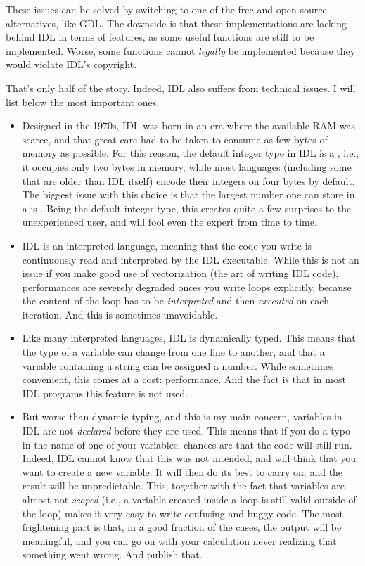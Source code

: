 \documentclass[12pt]{report}
\begin{document}
These issues can be solved by switching to one of the free and open-source alternatives, like GDL. The downside is that these implementations are lacking behind IDL in terms of features, as some useful functions are still to be implemented. Worse, some functions cannot \emph{legally} be implemented because they would violate IDL's copyright.

That's only half of the story. Indeed, IDL also suffers from technical issues. I will list below the most important ones.
\begin{itemize}
\item Designed in the 1970s, IDL was born in an era where the available RAM was scarce, and that great care had to be taken to consume as few bytes of memory as possible. For this reason, the default integer type in IDL is a , i.e., it occupies only two bytes in memory, while most languages (including some that are older than IDL itself) encode their integers on four bytes by default. The biggest issue with this choice is that the largest number one can store in a  is . Being the default integer type, this creates quite a few surprises to the unexperienced user, and will fool even the expert from time to time.
\item IDL is an interpreted language, meaning that the code you write is continuously read and interpreted by the IDL executable. While this is not an issue if you make good use of vectorization (the art of writing IDL code), performances are severely degraded onces you write loops explicitly, because the content of the loop has to be \emph{interpreted} and then \emph{executed} on each iteration. And this is sometimes unavoidable.
\item Like many interpreted languages, IDL is dynamically typed. This means that the type of a variable can change from one line to another, and that a variable containing a string can be assigned a number. While sometimes convenient, this comes at a cost: performance. And the fact is that in most IDL programs this feature is not used.
\item But worse than dynamic typing, and this is my main concern, variables in IDL are not \emph{declared} before they are used. This means that if you do a typo in the name of one of your variables, chances are that the code will still run. Indeed, IDL cannot know that this was not intended, and will think that you want to create a new variable. It will then do its best to carry on, and the result will be unpredictable. This, together with the fact that variables are almost not \emph{scoped} (i.e., a variable created inside a  loop is still valid outside of the loop) makes it very easy to write confusing and buggy code. The most frightening part is that, in a good fraction of the cases, the output will be meaningful, and you can go on with your calculation never realizing that something went wrong. And publish that.
\end{itemize}
\end{document}
